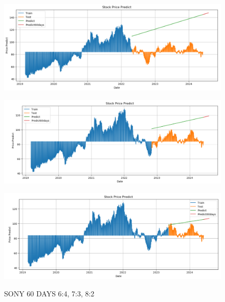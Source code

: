 \documentclass{article}
\begin{document}
\begin{multicols}{2}
\begin{figure}[H]
    \centering
    \begin{minipage}{0.15\textwidth}
    \centering
    \includegraphics[width=1\textwidth]{Image/Linear/Linear_SONY_6_4_60DAYS.png}
   
    \label{fig:1}
    \end{minipage}%
    \begin{minipage}{0.15\textwidth}
    \centering
    \includegraphics[width=1\textwidth]{Image/Linear/Linear_SONY_7_3_60DAYS.png}
  
    \label{fig:2}
    \end{minipage}%
    \begin{minipage}{0.15\textwidth}
    \centering
    \includegraphics[width=1\textwidth]{Image/Linear/Linear_SONY_8_2_60DAYS.png}

    \label{fig:3}
    \end{minipage}
    \caption{SONY 60 DAYS  6:4, 7:3, 8:2 }
\end{figure}



\end{multicols}
\end{document}
